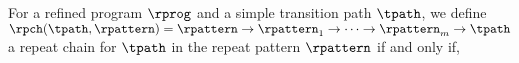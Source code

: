 \begin{enumerate}
%
  \begin{defn}
    \label{def:repeatchain-loop}
  For a refined program $\rprog$ and a simple transition path $\tpath$, we define
  $\rpch(\tpath, \rpattern) = \rpattern \to \rpattern_1 \to \cdots \to \rpattern_{m} \to \tpath$
  a repeat chain for $\tpath$ in the repeat pattern $\rpattern$
  if and only if,
  \begin{itemize}

\end{itemize}
\end{defn}
\end{enumerate}
